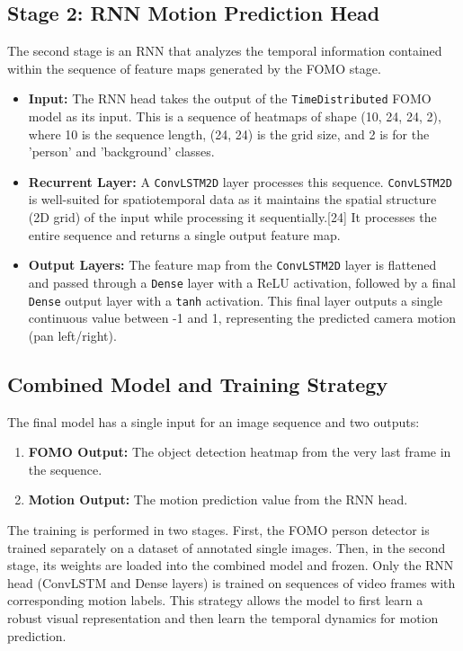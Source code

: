 \documentclass{article}
\begin{document}
\subsection{Stage 2: RNN Motion Prediction Head}
The second stage is an RNN that analyzes the temporal information contained within the sequence of feature maps generated by the FOMO stage.
\begin{itemize}
    \item \textbf{Input:} The RNN head takes the output of the \texttt{TimeDistributed} FOMO model as its input.
This is a sequence of heatmaps of shape (10, 24, 24, 2), where 10 is the sequence length, (24, 24) is the grid size, and 2 is for the 'person' and 'background' classes.
\item \textbf{Recurrent Layer:} A \texttt{ConvLSTM2D} layer processes this sequence. \texttt{ConvLSTM2D} is well-suited for spatiotemporal data as it maintains the spatial structure (2D grid) of the input while processing it sequentially.[24]
It processes the entire sequence and returns a single output feature map.
\item \textbf{Output Layers:} The feature map from the \texttt{ConvLSTM2D} layer is flattened and passed through a \texttt{Dense} layer with a ReLU activation, followed by a final \texttt{Dense} output layer with a \texttt{tanh} activation.
This final layer outputs a single continuous value between -1 and 1, representing the predicted camera motion (pan left/right).
\end{itemize}

\subsection{Combined Model and Training Strategy}
The final model has a single input for an image sequence and two outputs:
\begin{enumerate}
    \item \textbf{FOMO Output:} The object detection heatmap from the very last frame in the sequence.
\item \textbf{Motion Output:} The motion prediction value from the RNN head.
\end{enumerate}
The training is performed in two stages.
First, the FOMO person detector is trained separately on a dataset of annotated single images.
Then, in the second stage, its weights are loaded into the combined model and frozen.
Only the RNN head (ConvLSTM and Dense layers) is trained on sequences of video frames with corresponding motion labels.
This strategy allows the model to first learn a robust visual representation and then learn the temporal dynamics for motion prediction.
\end{document}
